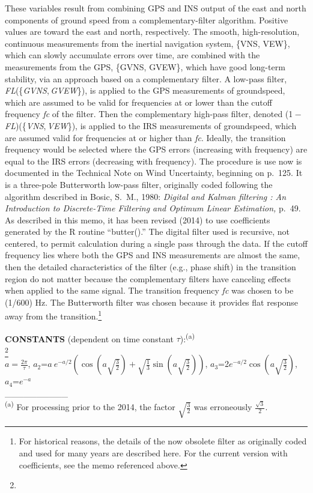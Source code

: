 \documentclass[
  english,
]{book}
\begin{document}
These variables result from combining GPS and INS output of the east and
north components of ground speed from a
\protect\hypertarget{compFilter}{}{complementary-filter} algorithm.
Positive values are toward the east and north, respectively. The smooth,
high-resolution, continuous measurements from the inertial navigation
system, \{VNS, VEW\}, which can slowly accumulate errors over time, are
combined with the measurements from the GPS, \{GVNS, GVEW\}, which have
good long-term stability, via an approach based on a complementary
filter. A low-pass filter,
{\emph{F}\emph{L}(\{\emph{GVNS}, \emph{GVEW}\})}, is applied to the GPS
measurements of groundspeed, which are assumed to be valid for
frequencies at or lower than the cutoff frequency {\emph{f}\emph{c}} of
the filter. Then the complementary high-pass filter, denoted
({1 − \emph{F}\emph{L}})({\{\emph{VNS}, \emph{VEW}\}}), is applied to
the IRS measurements of groundspeed, which are assumed valid for
frequencies at or higher than {\emph{f}\emph{c}}. Ideally, the
transition frequency would be selected where the GPS errors (increasing
with frequency) are equal to the IRS errors (decreasing with frequency).
The procedure is use now is documented in the Technical Note on Wind
Uncertainty, beginning on p.~125. It is a three-pole Butterworth
low-pass filter, originally coded following the algorithm described in
Bosic, S.~M., 1980: \emph{Digital and Kalman filtering : An Introduction
to Discrete-Time Filtering and Optimum Linear Estimation,} p.~49. As
described in this memo, it has been revised (2014) to use coefficients
generated by the R routine ``butter().'' The digital filter used is
recursive, not centered, to permit calculation during a single pass
through the data. If the cutoff frequency lies where both the GPS and
INS measurements are almost the same, then the detailed characteristics
of the filter (e.g., phase shift) in the transition region do not matter
because the complementary filters have canceling effects when applied to
the same signal. The transition frequency {\emph{f}\emph{c}} was chosen
to be (1/600) Hz. The Butterworth filter was chosen because it provides
flat response away from the transition.\footnote{For historical reasons,
  the details of the now obsolete filter as originally coded and used
  for many years are described here. For the current version with
  coefficients, see the memo referenced above.}

\textbf{CONSTANTS} (dependent on time constant
\(\tau\)):\textsuperscript{(a)}\\
\footnote{}\\
\(a=\frac{2\pi}{\tau}\),
\(a_{2}\)=\(a\ e^{-a/2}(\cos(a\sqrt{\frac{3}{2}})+\sqrt{\frac{1}{3}}\sin(a\sqrt{\frac{3}{2}}))\),
\(a_{3}\)=2\(e^{-a/2}\)\(\cos(a\sqrt{\frac{3}{2}})\),
\(a_{4}\)=\(e^{-a}\)\\
\_\_\_\_\_\_\_\_\_\_\\
\textsuperscript{(a)} For processing prior to the 2014, the factor
\(\sqrt{\frac{3}{2}}\) was erroneously \(\frac{\sqrt{3}}{2}\).
\end{document}
